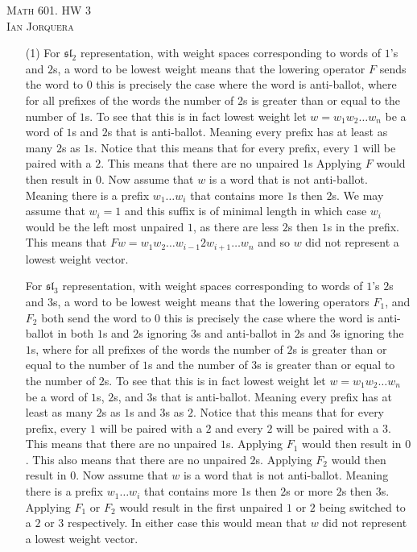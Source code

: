 \documentclass[12pt]{amsart}
\begin{document}
\begin{center}
    \textsc{Math 601. HW 3\\ Ian Jorquera}
\end{center}
\vspace{1em}
\begin{itemize}
    \item[(1)] %
    For $\mathfrak{sl_2}$ representation, with weight spaces corresponding to words of $1$'s and $2$s, a word 
    to be lowest weight means that the lowering operator $F$ sends the word to $0$ this is precisely the case 
    where the word is anti-ballot, where for all prefixes of the words the number of $2$s is greater than or 
    equal to the number of $1$s. To see that this is in fact lowest weight let $w=w_1w_2\dots w_n$ 
    be a word of $1$s and $2$s that is anti-ballot. 
    Meaning every prefix has at least as many $2$s as $1$s. Notice that this 
    means that for every prefix, every $1$ will be paired with a $2$. 
    This means that there are no unpaired $1$s Applying $F$ would then result in $0$.
    Now assume that $w$ is a word that is not anti-ballot. Meaning there is a prefix 
    $w_1\dots w_i$ that contains more $1$s then $2$s. We may assume that 
    $w_i=1$ and this suffix is of minimal length 
    in which case $w_i$ would be the left most unpaired $1$, as there are less 
    $2$s then $1$s 
    in the prefix. This means that $Fw=w_1w_2\dots w_{i-1}2w_{i+1}\dots w_n$ and 
    so $w$ did not represent a lowest weight vector.


    For $\mathfrak{sl_3}$ representation, with weight spaces corresponding to words of $1$'s $2$s and $3$s, a word 
    to be lowest weight means that the lowering operators $F_1$, and $F_2$ both send the word to $0$ 
    this is precisely the case 
    where the word is anti-ballot in both $1$s and $2$s ignoring $3$s and anti-ballot in $2$s and $3$s ignoring the $1$s,
    where for all prefixes of the words the number of $2$s is greater than or 
    equal to the number of $1$s and the number of $3$s is greater than or 
    equal to the number of $2$s. To see that this is in fact lowest weight let $w=w_1w_2\dots w_n$ 
    be a word of $1$s, $2$s, and $3$s that is anti-ballot. 
    Meaning every prefix has at least as many $2$s as $1$s and $3$s as $2$. Notice that this 
    means that for every prefix, every $1$ will be paired with a $2$ and every $2$ will be paired with a $3$. 
    This means that there are no unpaired $1$s. Applying $F_1$ would then result in $0$.
    This also means that there are no unpaired $2$s. Applying $F_2$ would then result in $0$.
    Now assume that $w$ is a word that is not anti-ballot. Meaning there is a prefix 
    $w_1\dots w_i$ that contains more $1$s then $2$s or more $2$s then $3$s. Applying $F_1$ or $F_2$ 
    would result in the first unpaired $1$ or $2$ being switched to a $2$ or $3$ respectively.
    In either case this would mean that $w$ did not represent a lowest weight vector.\\



\end{itemize}
\end{document}
